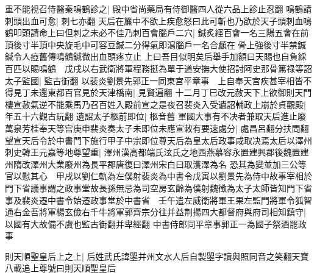 重不能視召侍醫秦鳴鶴診之|{
	殿中省尚藥局有侍御醫四人從六品上診止忍翻}
鳴鶴請刺頭出血可愈|{
	刺七亦翻}
天后在簾中不欲上疾愈怒曰此可斬也乃欲於天子頭刺血鳴鶴叩頭請命上曰但刺之未必不佳乃刺百會腦戶二穴|{
	鍼炙經百會一名三陽五會在前頂後寸半頂中央旋毛中可容豆鍼二分得氣即瀉腦戶一名合顱在骨上強後寸半禁鍼鍼令人瘂舊傳鳴鶴鍼微出血頭疼立止}
上曰吾目似明矣后舉手加額曰天賜也自負綵百匹以賜鳴鶴　戊戌以右武衛將軍程務挺為單于道安撫大使招討阿史那骨篤禄等詔太子監國|{
	監古衘翻}
以裴炎劉景先郭正一同東宫平章事　上自奉天宫疾甚宰相皆不得見丁未還東都百官見於天津橋南|{
	見賢遍翻}
十二月丁巳改元赦天下上欲御則天門樓宣赦氣逆不能乘馬乃召百姓入殿前宣之是夜召裴炎入受遺詔輔政上崩於貞觀殿|{
	年五十六觀古玩翻}
遺詔太子柩前即位|{
	柩音舊}
軍國大事有不决者兼取天后進止廢萬泉芳桂奉天等宫庚申裴炎奏太子未即位未應宣敇有要速處分|{
	處昌呂翻分扶問翻}
望宣天后令於中書門下施行甲子中宗即位尊天后為皇太后政事咸取决焉太后以澤州刺史韓王元嘉等地尊望重|{
	澤州漢高都端氏泫氏之地西燕慕容永置建興郡後魏置建州隋改澤州大業廢州為長平郡唐復曰澤州宋白曰取濩澤為名}
恐其為變並加三公等官以慰其心　甲戌以劉仁軌為左僕射裴炎為中書令戊寅以劉景先為侍中故事宰相於門下省議事謂之政事堂故長孫無忌為司空房玄齡為僕射魏徵為太子太師皆知門下省事及裴炎遷中書令始遷政事堂於中書省　壬午遣左威衛將軍王果左監門將軍令狐智通右金吾將軍楊玄儉右千牛將軍郭齊宗分往并益荆揚四大都督府與府司相知鎮守|{
	以國有大故備不虞也監古衘翻并卑經翻}
中書侍郎同平章事郭正一為國子祭酒罷政事

則天順聖皇后上之上|{
	后姓武氏諱曌并州文水人后自製曌字讀與照同音之笑翻天寶八載追上尊號曰則天順聖皇后}


